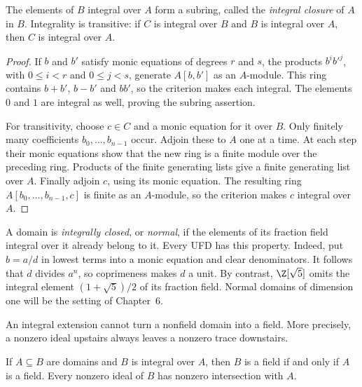 \begin{corollary}\label{cor:integralclosure}
The elements of $B$ integral over $A$ form a subring, called the \emph{integral closure} of $A$ in $B$. Integrality is transitive: if $C$ is integral over $B$ and $B$ is integral over $A$, then $C$ is integral over $A$.
\end{corollary}

\begin{proof}
If $b$ and $b'$ satisfy monic equations of degrees $r$ and $s$, the products $b^ib'^j$, with $0\le i<r$ and $0\le j<s$, generate $A[b,b']$ as an $A$-module. This ring contains $b+b'$, $b-b'$ and $bb'$, so the criterion makes each integral. The elements $0$ and $1$ are integral as well, proving the subring assertion.

For transitivity, choose $c\in C$ and a monic equation for it over $B$. Only finitely many coefficients $b_0,\ldots,b_{n-1}$ occur. Adjoin these to $A$ one at a time. At each step their monic equations show that the new ring is a finite module over the preceding ring. Products of the finite generating lists give a finite generating list over $A$. Finally adjoin $c$, using its monic equation. The resulting ring $A[b_0,\ldots,b_{n-1},c]$ is finite as an $A$-module, so the criterion makes $c$ integral over $A$.
\end{proof}

A domain is \emph{integrally closed}, or \emph{normal}, if the elements of its fraction field integral over it already belong to it. Every UFD has this property. Indeed, put $b=a/d$ in lowest terms into a monic equation and clear denominators. It follows that $d$ divides $a^n$, so coprimeness makes $d$ a unit. By contrast, $\Z[\sqrt5]$ omits the integral element $(1+\sqrt5)/2$ of its fraction field. Normal domains of dimension one will be the setting of Chapter~6.

An integral extension cannot turn a nonfield domain into a field. More precisely, a nonzero ideal upstairs always leaves a nonzero trace downstairs.

\begin{lemma}\label{lem:intfield}
If $A\subseteq B$ are domains and $B$ is integral over $A$, then $B$ is a field if and only if $A$ is a field. Every nonzero ideal of $B$ has nonzero intersection with $A$.
\end{lemma}

